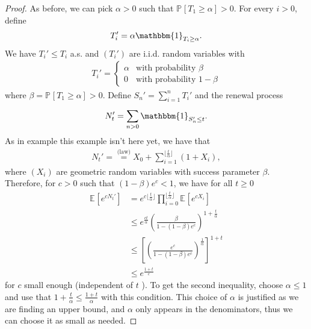 \begin{proof}
	As before, we can pick $\alpha>0$ such that $\mathbb{P}_{} \left[ T_1 \geq \alpha  \right] >0$. For every $i> 0$, define
	\begin{align}
		T_i' = \alpha \mathbbm{1}_{T_i \geq \alpha}. 
	\end{align}
	We have $T_i' \leq T_i$ a.s. and $(T_i')$ are i.i.d. random variables with 
	\begin{align}
		T_i' = 
		\begin{cases}
			\alpha & \textrm{with probability } \beta \\
			0 & \textrm{with probability } 1-\beta
		\end{cases}
	\end{align}
	where $\beta = \mathbb{P}_{} \left[ T_1 \geq \alpha \right] > 0 $. Define $S_n'= \sum_{i=1}^{n} T_i'$ and the renewal process
	\begin{align}
		N_t' = \sum_{n> 0}^{} \mathbbm{1}_{S_n' \leq t} .
	\end{align}
	As in example {\color{blue} this example isn't here yet}, we have that
	\begin{align}
		N_t' = \stackrel{\textrm{(law)}}{=} X_0 + \sum_{i=1}^{\lfloor \frac{t}{\alpha } \rfloor} (1 + X_i),
	\end{align}
	where $(X_i)$ are geometric random variables with success parameter $\beta$. Therefore, for $c> 0$ such that $(1-\beta)e^c<1$, we have for all $t\geq 0$
	\begin{align}
	\mathbb{E}_{} \left[ e^{cN_t'} \right]  &= e ^{c\lfloor \frac{t}{\alpha}\rfloor} \prod_{i=0}^{\lfloor \frac{t}{\alpha }\rfloor} \mathbb{E}_{} \left[ e^{cX_i} \right] \\
						&\leq e^{\frac{ct}{\alpha }} \left( \frac{\beta }{1 - (1-\beta )e^c} \right)^{1 + \frac{t}{\alpha }} \\
						&\leq \left[ \left( \frac{e^c}{1 - (1-\beta )e^c} \right)^{\frac{1}{\alpha }} \right]^{1+t} \\
						&\leq e^\frac{1+t}{c}
	\end{align}
	for $c$ small enough (independent of $t$ ).
	{\color{blue} To get the second inequality, choose $\alpha \leq 1$ and use that $1+ \frac{t}{\alpha } \leq \frac{1+t}{\alpha }$ with this condition. This choice of $\alpha $ is justified as we are finding an upper bound, and $\alpha $ only appears in the denominators, thus we can choose it as small as needed.}	
\end{proof}


